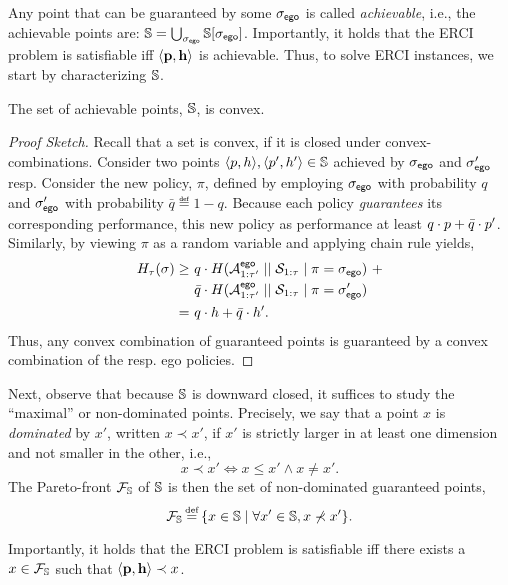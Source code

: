 Any point that can be guaranteed by some ${\sigma_{\mathsf{ego}}}$ is called
\emph{achievable}, i.e., the achievable points are: $ \mathbb{S} =
\bigcup_{{\sigma_{\mathsf{ego}}}} \mathbb{S}[{\sigma_{\mathsf{ego}}}]$.  Importantly, it holds
that the ERCI problem is satisfiable iff $\langle \mathbf{p},
\mathbf{h} \rangle$ is achievable.   Thus, to solve ERCI instances, we start by characterizing
$\mathbb{S}$.


\begin{proposition}
  The set of achievable points, $\mathbb{S}$, is convex. 
\end{proposition}
\begin{proof}[Proof Sketch]
  Recall that a set is convex, if it is closed under
  convex-combinations\footnotemark. Consider two points
  $\langle p, h \rangle, \langle p', h' \rangle \in
  \mathbb{S}$ achieved by ${\sigma_{\mathsf{ego}}}$ and ${\sigma'_{\mathsf{ego}}}$
  resp. Consider the new policy, $\pi$, defined by employing
  ${\sigma_{\mathsf{ego}}}$ with probability $q$ and ${\sigma'_{\mathsf{ego}}}$ with
  probability $\bar{q} \eqdef 1 - q$.  Because each policy
  \emph{guarantees} its corresponding performance, this new policy as
  performance at least $q\cdot p + \bar{q}\cdot p'$.  Similarly,
  by viewing $\pi$ as a random variable and applying chain rule
  yields,
  \begin{equation}
    \begin{split}
      H_\tau(\sigma)
      \geq &~q \cdot H( {\mathcal{A}}^{\mathsf{ego}}_{1:\tau'} \mid\mid {\mathcal{S}}_{1:\tau} \mid \pi={\sigma_{\mathsf{ego}}})~+\\
      &~\bar{q}  \cdot H( {\mathcal{A}}^{\mathsf{ego}}_{1:\tau'} \mid\mid {\mathcal{S}}_{1:\tau} \mid \pi={\sigma'_{\mathsf{ego}}})\\
      =&~q\cdot h + \bar{q}\cdot h'.
    \end{split}
  \end{equation}
  Thus, any convex combination of guaranteed points is guaranteed by
  a convex combination of the resp. ego policies.
\end{proof}

Next, observe that because $\mathbb{S}$ is downward closed, it
suffices to study the ``maximal'' or non-dominated points.  Precisely,
we say that a point $x$ is \emph{dominated} by $x'$, written $x \prec
x'$, if $x'$ is strictly larger in at least one dimension and not
smaller in the other, i.e., 
\begin{equation}
x \prec x' \iff x \leq x' \wedge x \neq x'.
\end{equation}
The Pareto-front $\mathcal{F}_{\mathbb{S}}$ of $\mathbb{S}$ is then the set of non-dominated guaranteed points,
\begin{equation}
  \pareto{\solutions} \eqdef \{ x \in \solutions \mid \forall x' \in \solutions, x \not\prec x'  \}.  
\end{equation}
\noindent
\begin{mdframed}
Importantly, it holds that the ERCI problem is satisfiable iff there exists a  $x \in \mathcal{F}_{\mathbb{S}}$ such that $\langle \mathbf{p}, \mathbf{h} \rangle \prec x$.    
\end{mdframed}

